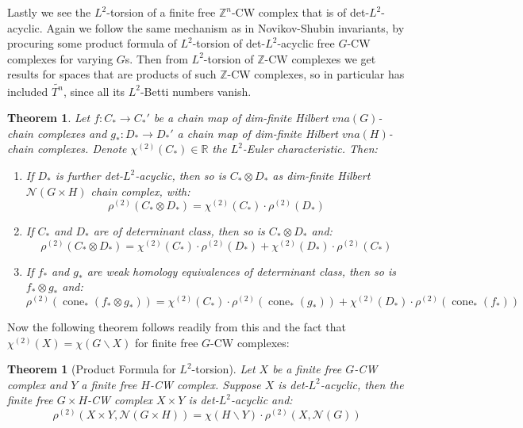 \documentclass[11pt]{report}
\theoremstyle{definition}
\theoremstyle{plain}
\newtheorem{Theo}[Def]{Theorem}
\DeclareMathOperator{\cone}{cone}
\newcommand{\real}{\mathbb{R}}
\newcommand{\integer}{\mathbb{Z}}
\newcommand{\vna}{\mathcal{N}}
\renewcommand{\tilde}{\widetilde}
\begin{document}
Lastly we see the $L^2$-torsion of a finite free $\integer^n$-CW complex that is of det-$L^2$-acyclic. Again we follow the same mechanism as in Novikov-Shubin invariants, by procuring some product formula of $L^2$-torsion of det-$L^2$-acyclic free $G$-CW complexes for varying $G$s. Then from $L^2$-torsion of $\integer$-CW complexes we get results for spaces that are products of such $\integer$-CW complexes, so in particular has included $\tilde{T^n}$, since all its $L^2$-Betti numbers vanish.
\begin{Theo}
	\textnormal{\cite[Theorem~3.35(6)]{luck2013}} Let $f:C_*\to C_*'$ be a chain map of dim-finite Hilbert $vna(G)$-chain complexes and  $g_*: D_*\to D_*'$ a chain map of dim-finite Hilbert $vna(H)$-chain complexes. Denote $\chi^{(2)}(C_*)\in \real$ the $L^2$-Euler characteristic. Then:\begin{enumerate}[label=\Roman*]
		\item If $D_*$ is further det-$L^2$-acyclic, then so is $C_*\otimes D_*$ as dim-finite Hilbert $\vna(G\times H)$ chain complex, with:
		\begin{equation}
		\rho^{(2)}(C_*\otimes D_*)=\chi^{(2)}(C_*)\cdot \rho^{(2)}(D_*)
		\end{equation}
		\item If $C_*$ and $D_*$ are of determinant class, then so is $C_*\otimes D_*$ and:
		\begin{equation}
		\rho^{(2)}(C_*\otimes D_*)=\chi^{(2)}(C_*)\cdot  \rho^{(2)}(D_*)+\chi^{(2)}(D_*)\cdot \rho^{(2)}(C_*)
		\end{equation}
		\item If $f_*$ and $g_*$ are weak homology equivalences of determinant class, then so is $f_*\otimes g_*$  and:
		\begin{equation}
		\rho^{(2)}(\cone_*(f_*\otimes g_*))=\chi^{(2)}(C_*)\cdot \rho^{(2)}(\cone_*(g_*))+\chi^{(2)}(D_*)\cdot \rho^{(2)}(\cone_*(f_*))
		\end{equation}
	\end{enumerate}
\end{Theo}
Now the following theorem follows readily from this and the fact that $\chi^{(2)}(X)=\chi(G\backslash X)$ for finite free $G$-CW complexes:
\begin{Theo}[Product Formula for $L^2$-torsion]\label{3.93(4)}
Let $X$ be a finite free $G$-CW complex and $Y$ a finite free $H$-CW complex. Suppose $X$ is det-$L^2$-acyclic, then the finite free $G\times H$-CW complex $X\times Y$ is det-$L^2$-acyclic and:
\begin{equation}
\rho^{(2)}(X\times Y, \vna(G\times H))=\chi(H\backslash Y)\cdot \rho^{(2)}(X, \vna(G))
\end{equation}
\end{Theo}
\end{document}
